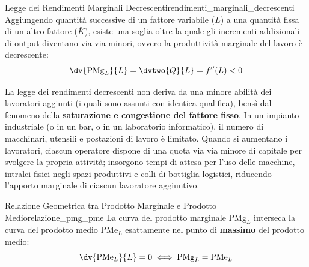 \begin{legge}{Legge dei Rendimenti Marginali Decrescenti}{rendimenti_marginali_decrescenti}
Aggiungendo quantità successive di un fattore variabile ($L$) a una quantità fissa di un altro fattore ($\bar{K}$), esiste una soglia oltre la quale gli incrementi addizionali di output diventano via via minori, ovvero la produttività marginale del lavoro è decrescente:
\begin{equation}
    \dv{\mathrm{PMg}_L}{L} = \dvtwo{Q}{L} = f''(L) < 0
\end{equation}
\end{legge}

\begin{osservazione}
La legge dei rendimenti decrescenti non deriva da una minore abilità dei lavoratori aggiunti (i quali sono assunti con identica qualifica), bensì dal fenomeno della \textbf{saturazione e congestione del fattore fisso}. In un impianto industriale (o in un bar, o in un laboratorio informatico), il numero di macchinari, utensili e postazioni di lavoro è limitato. Quando si aumentano i lavoratori, ciascun operatore dispone di una quota via via minore di capitale per svolgere la propria attività; insorgono tempi di attesa per l'uso delle macchine, intralci fisici negli spazi produttivi e colli di bottiglia logistici, riducendo l'apporto marginale di ciascun lavoratore aggiuntivo.
\end{osservazione}

\begin{teorema}{Relazione Geometrica tra Prodotto Marginale e Prodotto Medio}{relazione_pmg_pme}
La curva del prodotto marginale $\mathrm{PMg}_L$ interseca la curva del prodotto medio $\mathrm{PMe}_L$ esattamente nel punto di \textbf{massimo} del prodotto medio:
\begin{equation}
    \dv{\mathrm{PMe}_L}{L} = 0 \iff \mathrm{PMg}_L = \mathrm{PMe}_L
\end{equation}
\end{teorema}

